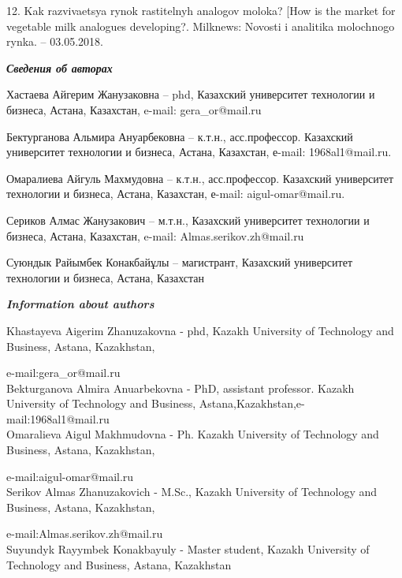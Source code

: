 12. Kak razvivaetsya rynok rastitel\textquotesingle nyh analogov moloka?
{[}How is the market for vegetable milk analogues developing?. Milknews:
Novosti i analitika molochnogo rynka. -- 03.05.2018.

\emph{{\bfseries Сведения об авторах}}

Хастаева Айгерим Жанузаковна -- phd, Казахский университет технологии и
бизнеса, Астана, Казахстан, e-mail: gera\_or@mail.ru

Бектурганова Альмира Ануарбековна -- к.т.н., асс.профессор. Казахский
университет технологии и бизнеса, Астана, Казахстан, е-mail:
1968al1@mail.ru.

Омаралиева Айгуль Махмудовна -- к.т.н., асс.профессор. Казахский
университет технологии и бизнеса, Астана, Казахстан, е-mail:
aigul-omar@mail.ru.

Сериков Алмас Жанузакович -- м.т.н., Казахский университет технологии и
бизнеса, Астана, Казахстан, e-mail: Almas.serikov.zh@mail.ru

Суюндык Райымбек Конакбайұлы -- магистрант, Казахский университет
технологии и бизнеса, Астана, Казахстан

\emph{{\bfseries Information about authors}}

Khastayeva Aigerim Zhanuzakovna - phd, Kazakh University of Technology
and Business, Astana, Kazakhstan,

e-mail:gera\_or@mail.ru\\
Bekturganova Almira Anuarbekovna - PhD, assistant professor. Kazakh
University of Technology and Business,
Astana,Kazakhstan,e-mail:1968al1@mail.ru\\
Omaralieva Aigul Makhmudovna - Ph. Kazakh University of Technology and
Business, Astana, Kazakhstan,

e-mail:aigul-omar@mail.ru\\
Serikov Almas Zhanuzakovich - M.Sc., Kazakh University of Technology and
Business, Astana, Kazakhstan,

e-mail:Almas.serikov.zh@mail.ru\\
Suyundyk Rayymbek Konakbayuly - Master student, Kazakh University of
Technology and Business, Astana, Kazakhstan
